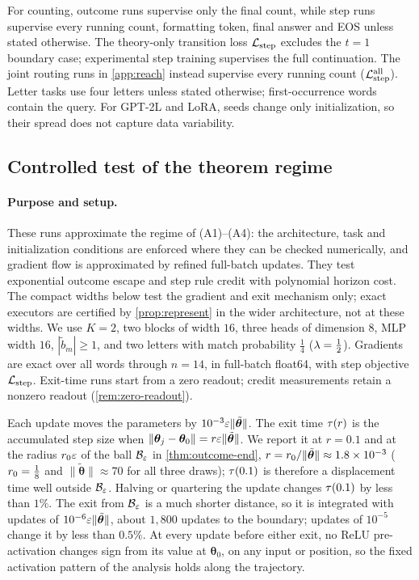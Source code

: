 For counting, outcome runs supervise only the final count, while step runs supervise every running count, formatting token,
final answer and EOS unless stated otherwise. The theory-only transition loss $\mathcal L_{\mathrm{step}}$ excludes the $t=1$ boundary case;
experimental step training supervises the full continuation. The joint routing runs in \cref{app:reach} instead supervise
every running count ($\mathcal L_{\mathrm{step}}^{\mathrm{all}}$). Letter tasks use four letters unless stated otherwise; first-occurrence words contain the query.
For GPT-2L and LoRA, seeds change only initialization, so their spread does not capture data variability.

\subsection{Controlled test of the theorem regime}
\label{app:exp-regime}
\label{app:regime}
\paragraph{Purpose and setup.} These runs approximate the regime of (A1)--(A4): the architecture, task and initialization conditions are enforced where
they can be checked numerically, and gradient flow is approximated by refined full-batch updates. They test exponential outcome
escape and step rule credit with polynomial horizon cost. The compact widths below test the gradient and exit mechanism only;
exact executors are certified by \cref{prop:represent} in the wider architecture, not at these widths.
We use $K=2$, two blocks of width $16$, three heads of dimension $8$, MLP width $16$, $|\tilde b_m|\ge1$,
and two letters with match probability $\tfrac{1}{4}$ ($\mixrate=\tfrac{1}{2}$). Gradients are exact over all words through $n=14$,
in full-batch float64, with step objective $\mathcal L_{\mathrm{step}}$. Exit-time runs start from a zero readout; credit measurements retain a
nonzero readout (\cref{rem:zero-readout}).

Each update moves the parameters by $10^{-3}\varepsilon\|\tilde{\bm\theta}\|$.
The exit time $\tau(r)$ is the accumulated step size when $\|\bm\theta_j-\bm\theta_0\|=r\varepsilon\|\tilde{\bm\theta}\|$. We report it at
$r=0.1$ and at the radius $r_0\varepsilon$ of the ball $\mathcal B_{\varepsilon}$ in \cref{thm:outcome-end}, $r=r_0/\|\tilde{\bm\theta}\|\approx1.8\times10^{-3}$
($\ballradius=\tfrac{1}{8}$ and $\|\tilde{\bm\theta}\|\approx70$ for all three draws); $\tau(0.1)$ is therefore a displacement time well outside $\mathcal B_{\varepsilon}$.
Halving or quartering the update changes $\tau(0.1)$ by less than $1\%$. The exit from $\mathcal B_{\varepsilon}$ is a much shorter distance, so
it is integrated with updates of $10^{-6}\varepsilon\|\tilde{\bm\theta}\|$, about $1{,}800$ updates to the boundary; updates of $10^{-5}$ change it by
less than $0.5\%$. At every update before either exit, no ReLU pre-activation
changes sign from its value at $\bm\theta_0$, on any input or position, so the fixed activation pattern of the analysis holds along the trajectory.

